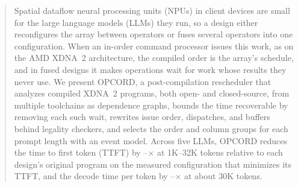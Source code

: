 \begin{abstract}
Spatial dataflow neural processing units (NPUs) in client devices are small for the large language models (LLMs) they run, so a design either reconfigures the array between operators or fuses several operators into one configuration.
When an in-order command processor issues this work, as on the AMD XDNA\texttrademark{}~2 architecture, the compiled order is the array's schedule, and in fused designs it makes operations wait for work whose results they never use.
We present OPCORD, a post-compilation rescheduler that analyzes compiled XDNA~2 programs, both open- and closed-source, from multiple toolchains as dependence graphs, bounds the time recoverable by removing each such wait, rewrites issue order, dispatches, and buffers behind legality checkers, and selects the order and column groups for each prompt length with an event model.
Across five LLMs, OPCORD reduces the time to first token (TTFT) by \PrefillGainLo--\PrefillGainHi$\times$ at 1K--32K tokens relative to each design's original program on the measured configuration that minimizes its TTFT, and the decode time per token by \DecodeGainLo--\DecodeGainHi$\times$ at about 30K tokens.

\end{abstract}
